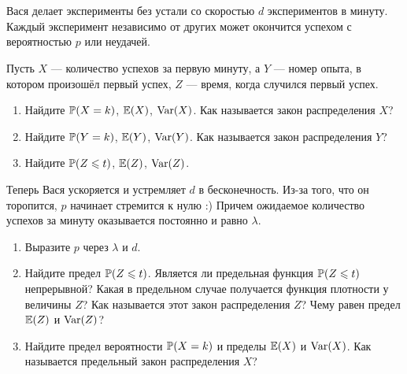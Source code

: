 




\section{}

\begin{problem}
Вася делает эксперименты без устали со скоростью $d$ экспериментов в минуту. Каждый эксперимент независимо от других может окончится успехом с вероятностью $p$ или неудачей.

Пусть $X$ — количество успехов за первую минуту, а $Y$ — номер опыта, в котором произошёл первый успех, $Z$ — время, когда случился первый успех.
\begin{enumerate}
\item Найдите $\P(X = k)$, $\E(X)$, $\Var(X)$. Как называется закон распределения $X$?
\item Найдите $\P(Y = k)$, $\E(Y)$, $\Var(Y)$. Как называется закон распределения $Y$?
\item Найдите $\P(Z \leq t)$, $\E(Z)$, $\Var(Z)$.
\end{enumerate}

Теперь Вася ускоряется и устремляет $d$ в бесконечность. Из-за того, что он торопится, $p$ начинает стремится к нулю :) Причем ожидаемое количество успехов за минуту оказывается постоянно и равно $\lambda$.

\begin{enumerate}[resume]
\item Выразите $p$ через $\lambda$ и $d$.
\item Найдите предел $\P(Z \leq t)$. Является ли предельная функция $\P(Z \leq t)$ непрерывной? Какая в предельном случае получается функция плотности у величины $Z$? Как называется этот закон распределения $Z$? Чему равен предел $\E(Z)$ и $\Var(Z)$?
\item Найдите предел вероятности $\P(X = k)$ и пределы $\E(X)$ и $\Var(X)$. Как называется предельный закон распределения $X$?
\end{enumerate}
\begin{sol}
\end{sol}
\end{problem}


